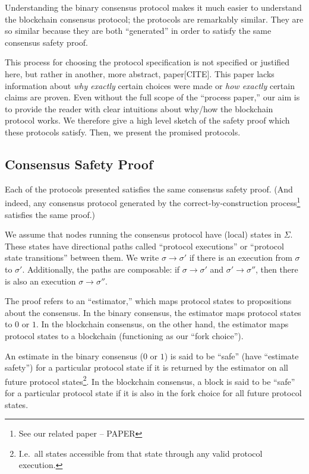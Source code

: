\documentclass{article}
\theoremstyle{definition}
\begin{document}
Understanding the binary consensus protocol makes it much easier to understand the blockchain consensus protocol; the protocols are remarkably similar. They are so similar because they are both ``generated'' in order to satisfy the same consensus safety proof.

This process for choosing the protocol specification is not specified or justified here, but rather in another, more abstract, paper[CITE]. This paper lacks information about \emph{why exactly} certain choices were made or \emph{how exactly} certain claims are proven. Even without the full scope of the ``process paper,'' our aim is to provide the reader with clear intuitions about why/how the blockchain protocol works. We therefore give a high level sketch of the safety proof which these protocols satisfy. Then, we present the promised protocols.

\subsection{Consensus Safety Proof}

Each of the protocols presented satisfies the same consensus safety proof. (And indeed, any consensus protocol generated by the correct-by-construction process\footnote{See our related paper -- PAPER} satisfies the same proof.)

We assume that nodes running the consensus protocol have (local) states in $\Sigma$. These states have directional paths called ``protocol executions'' or ``protocol state transitions'' between them. We write $\sigma \to \sigma'$ if there is an execution from $\sigma$ to $\sigma'$. Additionally, the paths are composable: if $\sigma \to \sigma'$ and $\sigma' \to \sigma''$, then there is also an execution $\sigma \to \sigma''$.

The proof refers to an ``estimator,'' which maps protocol states to propositions about the consensus. In the binary consensus, the estimator maps protocol states to $0$ or $1$. In the blockchain consensus, on the other hand, the estimator maps protocol states to a blockchain (functioning as our ``fork choice'').

An estimate in the binary consensus ($0$ or $1$) is said to be ``safe'' (have ``estimate safety'') for a particular protocol state if it is returned by the estimator on all future protocol states\footnote{I.e.\ all states accessible from that state through any valid protocol execution.}. In the blockchain consensus, a block is said to be ``safe'' for a particular protocol state if it is also in the fork choice for all future protocol states.
\end{document}
